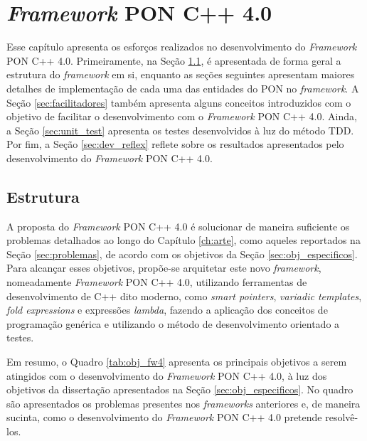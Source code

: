 \chapter{\textit{Framework} PON C++
4.0}\label{ch:desenvolvimento}\label{sec:fw4_dev}

Esse capítulo apresenta os esforços realizados no desenvolvimento do
\textit{Framework} PON C++ 4.0. Primeiramente, na Seção \ref{sec:estrutura_fw4},
é apresentada de forma geral a estrutura do \textit{framework} em si, enquanto
as seções seguintes apresentam maiores detalhes de implementação de cada uma das
entidades do PON no \textit{framework}. A Seção \ref{sec:facilitadores}
também apresenta alguns conceitos introduzidos com o objetivo de facilitar o
desenvolvimento com o \textit{Framework} PON C++ 4.0. Ainda, a Seção
\ref{sec:unit_test} apresenta os testes desenvolvidos à luz do método
TDD. Por fim, a Seção \ref{sec:dev_reflex} reflete sobre os resultados
apresentados pelo desenvolvimento do \textit{Framework} PON C++ 4.0.

\section{Estrutura}\label{sec:estrutura_fw4}

A proposta do \textit{Framework} PON C++ 4.0 é solucionar de maneira suficiente
os problemas detalhados ao longo do Capítulo \ref{ch:arte}, como aqueles
reportados na Seção \ref{sec:problemas}, de acordo com os objetivos da Seção
\ref{sec:obj_especificos}. Para alcançar esses objetivos, propõe-se arquitetar
este novo \textit{framework}, nomeadamente \textit{Framework} PON C++ 4.0,
utilizando ferramentas de desenvolvimento de C++ dito moderno, como
\textit{smart pointers}, \textit{variadic templates}, \textit{fold expressions}
e expressões \textit{lambda}, fazendo a aplicação dos conceitos de programação
genérica e utilizando o método de desenvolvimento orientado a testes. 

Em resumo, o Quadro \ref{tab:obj_fw4} apresenta os principais objetivos a serem
atingidos com o desenvolvimento do \textit{Framework} PON C++ 4.0, à luz dos
objetivos da dissertação apresentados na Seção \ref{sec:obj_especificos}. No
quadro são apresentados os problemas presentes nos \textit{frameworks}
anteriores e, de maneira sucinta, como o desenvolvimento do \textit{Framework}
PON C++ 4.0 pretende resolvê-los.

